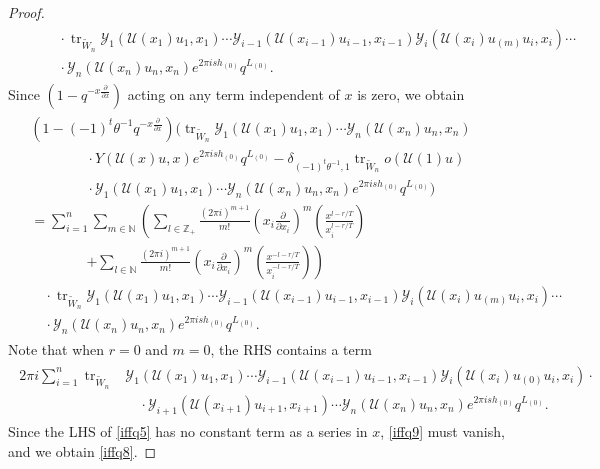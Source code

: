 \documentclass[9pt]{amsart}
\newcommand{\Y}{\mathcal{Y}}
\begin{document}
\begin{proof}
\begin{align}
\begin{split}
  &\quad\quad\cdot
    \operatorname{tr}_{\tilde{W}_n}
    \Y_1(\mathcal{U}(x_1)u_1,x_1) \cdots
    \Y_{i-1}(\mathcal{U}(x_{i-1})u_{i-1},x_{i-1})
    \Y_i(\mathcal{U}(x_i)u_{(m)}u_i,x_i) \cdots \\
  &\quad\quad\cdot
    \Y_n(\mathcal{U}(x_n)u_n,x_n) e^{2\pi i s h_{(0)}} q^{L_{(0)}}.
\end{split}
\end{align}
Since \( \left(1 - q^{-x\frac{\partial}{\partial x}}\right) \) acting on any term independent of \( x \) is zero, we obtain
\begin{align}\label{iffq5}
\begin{split}
  &\left(1 - (-1)^t \theta^{-1} q^{-x\frac{\partial}{\partial x}}\right)
    \Bigg(
      \operatorname{tr}_{\tilde{W}_n}
      \Y_1(\mathcal{U}(x_1)u_1,x_1) \cdots \Y_n(\mathcal{U}(x_n)u_n,x_n) \\
  &\quad\quad\quad\quad
      \cdot Y(\mathcal{U}(x)u,x) e^{2\pi i s h_{(0)}} q^{L_{(0)}} 
      - \delta_{(-1)^t\theta^{-1},1}
      \operatorname{tr}_{\tilde{W}_n} o(\mathcal{U}(1)u) \\
  &\quad\quad\quad\quad
      \cdot \Y_1(\mathcal{U}(x_1)u_1,x_1) \cdots \Y_n(\mathcal{U}(x_n)u_n,x_n)
      e^{2\pi i s h_{(0)}} q^{L_{(0)}}
    \Bigg) \\
  &=
    \sum_{i=1}^{n} \sum_{m \in \mathbb{N}}
    \left(
      \sum_{l \in \mathbb{Z}_+}
      \frac{(2\pi i)^{m+1}}{m!}
      \left(x_i \frac{\partial}{\partial x_i}\right)^m
      \left(\frac{x^{l - r/T}}{x_i^{l - r/T}}\right) \right. \\
  &\quad\quad\quad\quad\left.
      +
      \sum_{l \in \mathbb{N}}
      \frac{(2\pi i)^{m+1}}{m!}
      \left(x_i \frac{\partial}{\partial x_i}\right)^m
      \left(\frac{x^{-l - r/T}}{x_i^{-l - r/T}}\right)
    \right) \\
  &\quad\cdot
    \operatorname{tr}_{\tilde{W}_n}
    \Y_1(\mathcal{U}(x_1)u_1,x_1) \cdots
    \Y_{i-1}(\mathcal{U}(x_{i-1})u_{i-1},x_{i-1})
    \Y_i(\mathcal{U}(x_i)u_{(m)}u_i,x_i) \cdots \\
  &\quad\cdot
    \Y_n(\mathcal{U}(x_n)u_n,x_n)
    e^{2\pi i s h_{(0)}} q^{L_{(0)}}.
\end{split}
\end{align}
Note that when \( r = 0 \) and \( m = 0 \), the RHS contains a term
\begin{align}\label{iffq9}
\begin{split}
  2\pi i \sum_{i=1}^{n} \operatorname{tr}_{\tilde{W}_n}&
  \Y_1(\mathcal{U}(x_{1})u_{1},x_{1}) \cdots 
  \Y_{i-1}(\mathcal{U}(x_{i-1})u_{i-1},x_{i-1})
  \Y_i(\mathcal{U}(x_{i})u_{(0)}u_{i},x_{i}) \cdot\\
  &\quad\cdot 
  \Y_{i+1}(\mathcal{U}(x_{i+1})u_{i+1},x_{i+1}) \cdots 
  \Y_n(\mathcal{U}(x_{n})u_{n},x_{n})
  e^{2\pi i s h_{(0)}} q^{L_{(0)}}.
\end{split}
\end{align}
Since the LHS of \eqref{iffq5} has no constant term as a series in \( x \), \eqref{iffq9} must vanish, and we obtain \eqref{iffq8}.


\end{proof}
\end{document}
